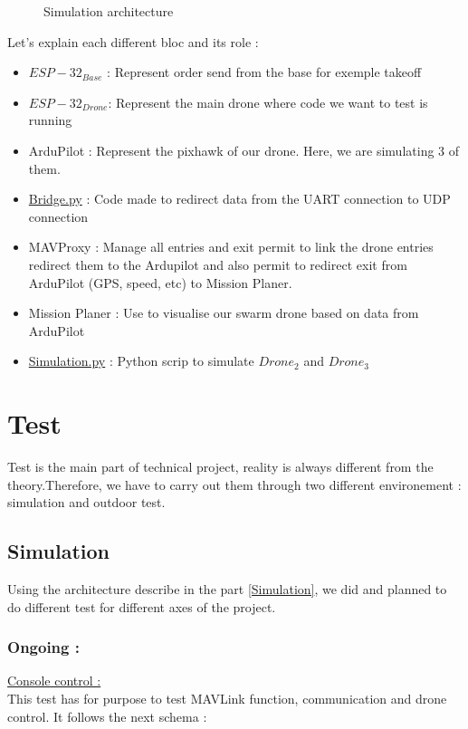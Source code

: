 \begin{figure}[H]
  \centering
   \resizebox{0.9\textwidth}{!}{\SchSimulation}
  \caption{Simulation architecture}
\end{figure}

Let's explain each different bloc and its role : 
\begin{itemize}
    \item $ESP-32_{Base}$ : Represent order send from the base for exemple takeoff
    \item $ESP-32_{Drone}$: Represent the main drone where code we want to test is running
    \item ArduPilot : Represent the pixhawk of our drone. Here, we are simulating 3 of them. 
    \item \href{https://github.com/M1chigan/Projet-S-IoT-Essaim-de-Drone/blob/main/Simulation/Script%20d'essai/Bridge.py}{Bridge.py} : Code made to redirect data from the UART connection to UDP connection 
    \item MAVProxy : Manage all entries and exit permit to link the drone entries redirect them to the Ardupilot and also permit to redirect exit from ArduPilot (GPS, speed, etc) to Mission Planer.
    \item Mission Planer : Use to visualise our swarm drone based on data from ArduPilot
    \item \href{https://github.com/M1chigan/Projet-S-IoT-Essaim-de-Drone/blob/main/Simulation/Script%20d'essai/Simulation.py}{Simulation.py}  : Python scrip to simulate $Drone_2$ and $Drone_3$
\end{itemize}
\newpage
\section{Test}
Test is the main part of technical project, reality is always different from the theory.Therefore, we have to carry out them through two different environement : simulation and outdoor test.
\subsection{Simulation}
Using the architecture describe in the part \ref{Simulation}, we did and planned to do different test for different axes of the project.  
\subsubsection{Ongoing : }

\underline{Console control :} \\
This test has for purpose to test MAVLink function, communication and drone control. It follows the next schema : \\

